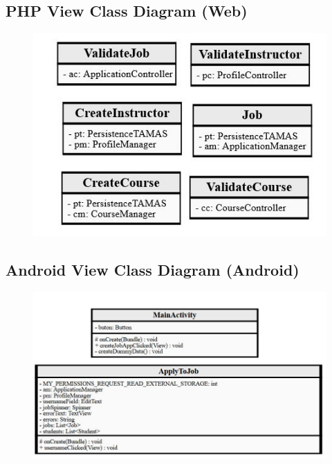 \documentclass[12pt]{article}
\begin{document}
\subsection{PHP View Class Diagram (Web)}
\begin{figure}[H]
	\centering
	\includegraphics[]{./ClassDiagrams/WebViewPackageDiagram.jpg}
\end{figure}
\subsection{Android View Class Diagram (Android)}
\begin{figure}[H]
	\centering
	\includegraphics[]{./ClassDiagrams/AndroidViewPackageDiagram}
\end{figure}
\end{document}
